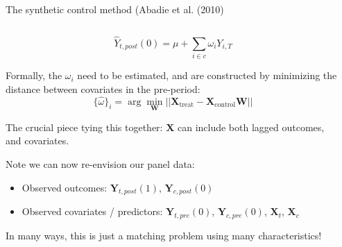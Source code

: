 \documentclass[notes,11pt, aspectratio=169]{beamer}
\newenvironment{wideitemize}{\itemize\addtolength{\itemsep}{10pt}}{\enditemize}
\begin{document}
\begin{frame}{The synthetic control method (Abadie et al. (2010)}
  \begin{columns}[T] %
    \begin{column}{0.9\textwidth}
  \begin{equation*}
    \hat{Y}_{t,post}(0) = \mu + \sum_{i \in c}\omega_{i} Y_{i, T}
  \end{equation*}
  \begin{wideitemize}
  \item Formally, the $\omega_{i}$ need to be estimated, and are
    constructed by minimizing the distance between covariates in the pre-period:
    \begin{equation*}
      \{\hat{\omega} \}_{i} = \arg\min_{\boldsymbol{W}}||\boldsymbol{X}_{\text{treat}} - \boldsymbol{X}_{\text{control}}\boldsymbol{W}||
    \end{equation*}
  \item The crucial piece tying this together: $\boldsymbol{X}$ can
    include both lagged outcomes, and covariates.
  \item Note we can now re-envision our panel data:
    \begin{itemize}
    \item Observed outcomes:     $\mathbf{Y}_{t,post}(1)$, $\mathbf{Y}_{c,post}(0)$
    \item Observed covariates / predictors: $\mathbf{Y}_{t,pre}(0)$, $\mathbf{Y}_{c,pre}(0)$, $\mathbf{X}_{t}$, $\mathbf{X}_{c}$
    \end{itemize}
  \item In many ways, this is just a matching problem using many characteristics!
  \end{wideitemize}
\end{column}
\begin{column}{0.4\textwidth}
\end{column}
\end{columns}
\end{frame}
\end{document}
